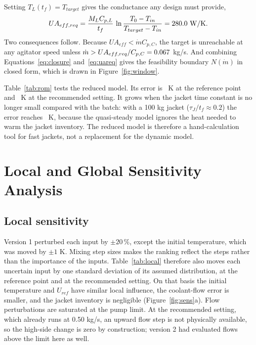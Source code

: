 \documentclass[11pt,letterpaper]{article}
\newcommand{\mdot}{\dot m}
\begin{document}
Setting \(T_L(t_f) = T_{target}\) gives the conductance any design must provide,
\begin{equation}
UA_{eff,req} = \frac{M_LC_{p,L}}{t_f}\,\ln\frac{T_0 - T_{in}}{T_{target} - T_{in}} = 280.0\ \mathrm{W/K}. \label{eq:uareq}
\end{equation}
Two consequences follow. Because \(UA_{eff} < \mdot C_{p,C}\), the target is unreachable at any agitator speed unless \(\mdot > UA_{eff,req}/C_{p,C} = \vMinFlow\) kg/s. And combining Equations~\ref{eq:closure} and~\ref{eq:uareq} gives the feasibility boundary \(N(\mdot)\) in closed form, which is drawn in Figure~\ref{fig:window}.

Table~\ref{tab:rom} tests the reduced model. Its error is \vRomErrBase\ K at the reference point and \vRomErrRec\ K at the recommended setting. It grows when the jacket time constant is no longer small compared with the batch: with a 100 kg jacket (\(\tau_J/t_f \approx 0.2\)) the error reaches \vRomErrMaxAbs\ K, because the quasi-steady model ignores the heat needed to warm the jacket inventory. The reduced model is therefore a hand-calculation tool for fast jackets, not a replacement for the dynamic model.

\begin{table}[H]
\centering
\caption{Reduced-order (quasi-steady) model versus the full RK4 model at \(t_f = 1800\) s.}\label{tab:rom}
{\small\setlength{\tabcolsep}{3.5pt}}
\end{table}

\section{Local and Global Sensitivity Analysis}

\subsection{Local sensitivity}
Version 1 perturbed each input by \(\pm 20\,\%\), except the initial temperature, which was moved by \(\pm 1\) K. Mixing step sizes makes the ranking reflect the steps rather than the importance of the inputs. Table~\ref{tab:local} therefore also moves each uncertain input by one standard deviation of its assumed distribution, at the reference point and at the recommended setting. On that basis the initial temperature and \(U_{ref}\) have similar local influence, the coolant-flow error is smaller, and the jacket inventory is negligible (Figure~\ref{fig:sens}a). Flow perturbations are saturated at the pump limit. At the recommended setting, which already runs at 0.50 kg/s, an upward flow step is not physically available, so the high-side change is zero by construction; version 2 had evaluated flows above the limit here as well.
\end{document}
